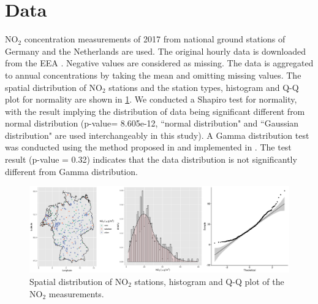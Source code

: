 \documentclass{article}
\begin{document}
 
\section{Data}
NO$_2$ concentration measurements of 2017 from national ground stations of Germany and the Netherlands are used. The original hourly data is downloaded from the EEA \citep[European Environment Agency,][]{nelson1999european,EEA}. Negative values are considered as missing. The data is aggregated to annual concentrations by taking the mean and omitting missing values. The spatial distribution of NO$_2$ stations and the station types, histogram and Q-Q plot for normality are shown in \cref{fig:histqq}. %
We conducted a Shapiro test for normality, with the result implying the distribution of data being significant different from normal distribution (p-value= 8.605e-12, ``normal distribution" and ``Gaussian distribution" are used interchangeably in this study).
A Gamma distribution test was conducted using the method proposed in \cite{villasenor2015variance} and implemented in \cite{goft}.  The test result (p-value = 0.32) indicates that the data distribution is not significantly different from Gamma distribution.

\begin{figure}
    \centering
    \includegraphics[scale=0.06]{fig/histqq_NO2.png}
    \caption{Spatial distribution of NO$_2$ stations, histogram and Q-Q plot of the NO$_2$ measurements.}
    \label{fig:histqq}
\end{figure}{}
\end{document}
